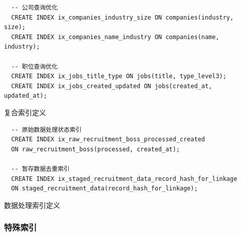   \begin{listing}[htbp]
    \begin{verbatim}
  -- 公司查询优化
  CREATE INDEX ix_companies_industry_size ON companies(industry, size);
  CREATE INDEX ix_companies_name_industry ON companies(name, industry);
  
  -- 职位查询优化
  CREATE INDEX ix_jobs_title_type ON jobs(title, type_level3);
  CREATE INDEX ix_jobs_created_updated ON jobs(created_at, updated_at);
    \end{verbatim}
    \caption{复合索引定义}\label{lst:composite_indexes}
  \end{listing}
  
  \begin{listing}[htbp]
    \begin{verbatim}
  -- 原始数据处理状态索引
  CREATE INDEX ix_raw_recruitment_boss_processed_created 
  ON raw_recruitment_boss(processed, created_at);
  
  -- 暂存数据去重索引
  CREATE INDEX ix_staged_recruitment_data_record_hash_for_linkage 
  ON staged_recruitment_data(record_hash_for_linkage);
    \end{verbatim}
    \caption{数据处理索引定义}\label{lst:processing_indexes}
  \end{listing}
  
  \subsubsection{特殊索引}
  
